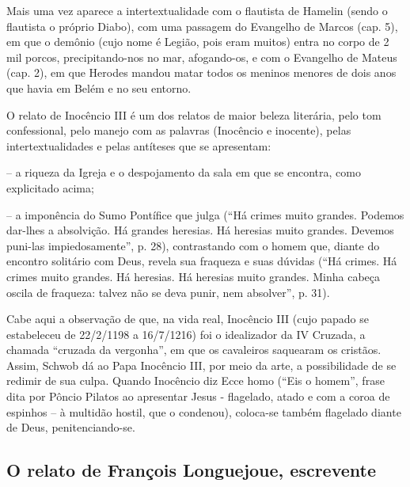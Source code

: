\documentclass[12pt]{extarticle}
\begin{document}


Mais uma vez aparece a intertextualidade com o flautista de Hamelin
(sendo o flautista o próprio Diabo), com uma passagem do Evangelho de
Marcos (cap. 5), em que o demônio (cujo nome é Legião, pois eram muitos)
entra no corpo de 2 mil porcos, precipitando-nos no mar, afogando-os, e
com o Evangelho de Mateus (cap. 2), em que Herodes mandou matar todos os
meninos menores de dois anos que havia em Belém e no seu entorno.

O relato de Inocêncio III é um dos relatos de maior beleza literária,
pelo tom confessional, pelo manejo com as palavras (Inocêncio e
inocente), pelas intertextualidades e pelas antíteses que se
apresentam:

-- a riqueza da Igreja e o despojamento da sala em que se encontra, como
explicitado acima;

-- a imponência do Sumo Pontífice que julga (``Há crimes muito grandes.
Podemos dar-lhes a absolvição. Há grandes heresias. Há heresias muito
grandes. Devemos puni-las impiedosamente'', p. 28), contrastando com o
homem que, diante do encontro solitário com Deus, revela sua fraqueza e
suas dúvidas (``Há crimes. Há crimes muito grandes. Há heresias. Há
heresias muito grandes. Minha cabeça oscila de fraqueza: talvez não se
deva punir, nem absolver'', p. 31).

Cabe aqui a observação de que, na vida real, Inocêncio III (cujo papado
se estabeleceu de 22/2/1198 a 16/7/1216) foi o idealizador da IV
Cruzada, a chamada ``cruzada da vergonha'', em que os cavaleiros
saquearam os cristãos. Assim, Schwob dá ao Papa Inocêncio III, por meio
da arte, a possibilidade de se redimir de sua culpa. Quando Inocêncio
diz Ecce homo (``Eis o homem'', frase dita por Pôncio Pilatos ao
apresentar Jesus - flagelado, atado e com a coroa de espinhos -- à
multidão hostil, que o condenou), coloca-se também flagelado diante de
Deus, penitenciando-se.




\subsection{O relato de François Longuejoue, escrevente}
\end{document}
